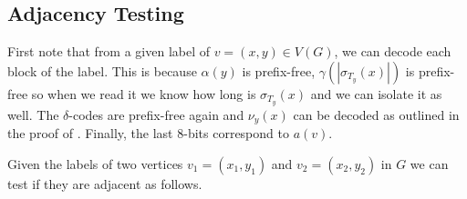 \documentclass[kpfonts]{patmorin}
\begin{document}
\subsection{Adjacency Testing}

First note that from a given label of $v=(x,y) \in V(G)$, we can decode each block of the label.
This is because $\alpha(y)$ is prefix-free, $\gamma(|\sigma_{T_y}(x)|)$ is prefix-free so when we read it we know how long is $\sigma_{T_y}(x)$ and we can isolate it as well.
The $\delta$-codes are prefix-free again and $\nu_y(x)$ can be decoded as outlined in the proof of .
Finally, the last $8$-bits correspond to $a(v)$.

Given the labels of two vertices $v_1=(x_1,y_1)$ and $v_2=(x_2,y_2)$ in $G$ we can test if they are adjacent as follows.
\end{document}
